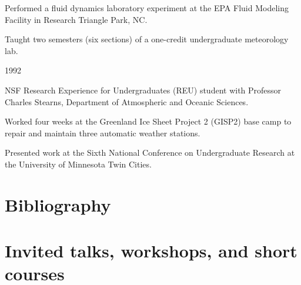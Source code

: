 \documentclass[letterpaper]{resume}
\begin{document}
\begin{compactitem}[\itembullet]
  \item Performed a fluid dynamics laboratory experiment at the EPA
    Fluid Modeling Facility in Research Triangle Park, NC.
\end{compactitem}

\begin{compactitem}[\itembullet]
  \item Taught two semesters (six sections) of a one-credit
    undergraduate meteorology lab.
\end{compactitem}

 {1992}
\begin{compactitem}[\itembullet]
  \item NSF Research Experience for Undergraduates (REU) student with
    Professor Charles Stearns, Department of Atmospheric and Oceanic
    Sciences.
  \item Worked four weeks at the Greenland Ice Sheet Project 2 (GISP2)
    base camp to repair and maintain three automatic weather stations.
  \item Presented work at the Sixth National Conference on
    Undergraduate Research at the University of Minnesota Twin Cities.
\end{compactitem}


\section{Bibliography}
\vspace{0.5em}

\nocite{*}




\section{Invited talks, workshops, and short courses}
\vspace{0.5em}
\end{document}
